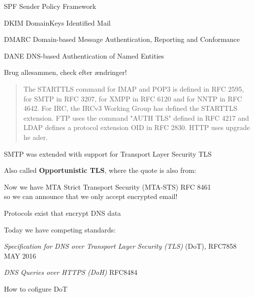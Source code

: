 \documentclass[Screen16to9,17pt]{foils}
\begin{document}
\begin{list2}
\item SPF Sender Policy Framework\\ {\footnotesize{}}
\item DKIM DomainKeys Identified Mail\\
{\footnotesize{}}
\item DMARC Domain-based Message Authentication, Reporting and Conformance\\
{\footnotesize{}}
\item DANE DNS-based Authentication of Named Entities\\ {\footnotesize{}}
\item Brug allesammen, check efter ændringer!
\end{list2}



\begin{quote}
The STARTTLS command for IMAP and POP3 is defined in RFC 2595, for SMTP in RFC 3207, for XMPP in RFC 6120 and for NNTP in RFC 4642. For IRC, the IRCv3 Working Group
 has defined the STARTTLS extension. FTP uses the command "AUTH TLS" defined in RFC 4217 and LDAP defines a protocol extension OID in RFC 2830. HTTP uses upgrade he
ader.
\end{quote}

\begin{list1}
\item SMTP was extended with support for Transport Layer Security TLS
\item Also called {\bf Opportunistic TLS}, where the quote is also from:\\ 
\item Now we have MTA Strict Transport Security (MTA-STS) RFC 8461\\
so we can announce that we only accept encrypted email!
\end{list1}




\begin{list2}
\item Protocols exist that encrypt DNS data
\item Today we have competing standards:
\item
\emph{Specification for DNS over Transport Layer Security (TLS)} (DoT), RFC7858 MAY 2016\\

\item \emph{DNS Queries over HTTPS (DoH)} RFC8484

\item How to cofigure DoT\\ 
\end{list2}
\end{document}
